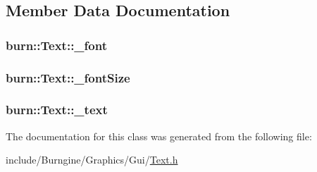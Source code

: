 \subsection{Member Data Documentation}
\hypertarget{classburn_1_1_text_aae8c3744db42bcc969aef7022b5e964e}{
\subsubsection[{\-\_\-font}]{ burn\-::\-Text\-::\-\_\-font\hspace{0.3cm}{\ttfamily [protected]}}}\label{classburn_1_1_text_aae8c3744db42bcc969aef7022b5e964e}
\hypertarget{classburn_1_1_text_a48512684eaf0d543b8089b359b87b88f}{
\subsubsection[{\-\_\-font\-Size}]{ burn\-::\-Text\-::\-\_\-font\-Size\hspace{0.3cm}{\ttfamily [protected]}}}\label{classburn_1_1_text_a48512684eaf0d543b8089b359b87b88f}
\hypertarget{classburn_1_1_text_a4d977a13462cae85ecde89f87dc73131}{
\subsubsection[{\-\_\-text}]{ burn\-::\-Text\-::\-\_\-text\hspace{0.3cm}{\ttfamily [protected]}}}\label{classburn_1_1_text_a4d977a13462cae85ecde89f87dc73131}


The documentation for this class was generated from the following file\-:\begin{DoxyCompactItemize}
\item 
include/\-Burngine/\-Graphics/\-Gui/\hyperlink{_text_8h}{Text.\-h}\end{DoxyCompactItemize}
